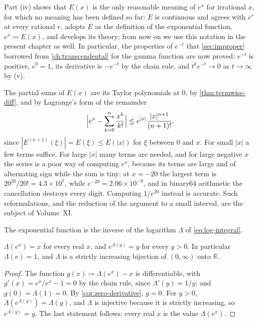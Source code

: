 Part (iv) shows that $E(x)$ is the only reasonable meaning of $e^x$ for irrational $x$, for which no meaning has been defined so far: $E$ is continuous and agrees with $e^r$ at every rational $r$.  adopts $E$ as the definition of the exponential function, $e^x\coloneqq E(x)$, and develops its theory; from now on we use this notation in the present chapter as well. In particular, the properties of $e^{-t}$ that \cref{sec:improper} borrowed from \cref{ch:transcendental} for the gamma function are now proved: $e^{-t}$ is positive, $e^0=1$, its derivative is $-e^{-t}$ by the chain rule, and $t^ke^{-t}\to0$ as $t\to\infty$ by (v).

The partial sums of $E(x)$ are its Taylor polynomials at $0$, by \cref{thm:termwise-diff}, and by Lagrange's form of the remainder
\begin{equation}
\Bigl|e^x-\sum_{k=0}^n\frac{x^k}{k!}\Bigr|\le e^{|x|}\frac{|x|^{n+1}}{(n+1)!},
\label{eq:exp-remainder}
\end{equation}
since $|E^{(n+1)}(\xi)|=E(\xi)\le E(|x|)$ for $\xi$ between $0$ and $x$. For small $|x|$ a few terms suffice. For large $|x|$ many terms are needed, and for large negative $x$ the series is a poor way of computing $e^x$, because its terms are large and of alternating sign while the sum is tiny: at $x=-20$ the largest term is $20^{20}/20!=4.3\times10^7$, while $e^{-20}=2.06\times10^{-9}$, and in binary64 arithmetic the cancellation destroys every digit. Computing $1/e^{20}$ instead is accurate. Such reformulations, and the reduction of the argument to a small interval, are the subject of Volume~XI.

The exponential function is the inverse of the logarithm $\Lambda$ of \eqref{eq:log-integral}.

\begin{proposition}
\label{prop:log-exp}
$\Lambda(e^x)=x$ for every real $x$, and $e^{\Lambda(y)}=y$ for every $y>0$. In particular $\Lambda(e)=1$, and $\Lambda$ is a strictly increasing bijection of $(0,\infty)$ onto $\mathbb R$.
\end{proposition}

\begin{proof}
The function $g(x)\coloneqq\Lambda(e^x)-x$ is differentiable, with $g'(x)=e^x/e^x-1=0$ by the chain rule, since $\Lambda'(y)=1/y$; and $g(0)=\Lambda(1)=0$. By \cref{cor:zero-derivative}, $g=0$. For $y>0$, $\Lambda(e^{\Lambda(y)})=\Lambda(y)$, and $\Lambda$ is injective because it is strictly increasing, so $e^{\Lambda(y)}=y$. The last statement follows: every real $x$ is the value $\Lambda(e^x)$.
\end{proof}

